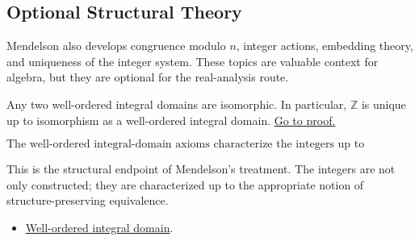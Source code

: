 \subsection*{Optional Structural Theory}

\begin{remark*}[Exposition]
Mendelson also develops congruence modulo \(n\), integer actions, embedding
theory, and uniqueness of the integer system. These topics are valuable
context for algebra, but they are optional for the real-analysis route.
\end{remark*}

\begin{theorem}
\label{thm:men-well-ordered-integral-domain-uniqueness}
Any two well-ordered integral domains are isomorphic. In particular,
\(\mathbb{Z}\) is unique up to isomorphism as a well-ordered integral domain.
\hyperref[prf:men-well-ordered-integral-domain-uniqueness]{Go to proof.}
\end{theorem}

\begin{remark*}
\[
  \text{The well-ordered integral-domain axioms characterize the integers up
  to isomorphism.}
\]
\end{remark*}

\begin{remark*}[Interpretation]
This is the structural endpoint of Mendelson's treatment. The integers are not
only constructed; they are characterized up to the appropriate notion of
structure-preserving equivalence.
\end{remark*}

\begin{dependencies}
\begin{itemize}
  \item \hyperref[def:men-well-ordered-integral-domain]{Well-ordered integral domain}.
\end{itemize}
\end{dependencies}
